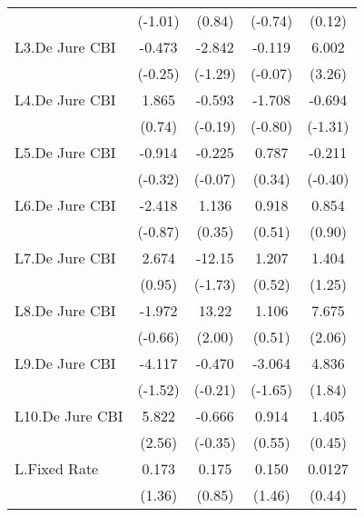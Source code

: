 {\begin{longtable}{l*{4}{c}}
                &  (-1.01)         &   (0.84)         &  (-0.74)         &   (0.12)         \\
[1em]
L3.De Jure CBI  &   -0.473         &   -2.842         &   -0.119         &    6.002\sym{**} \\
                &  (-0.25)         &  (-1.29)         &  (-0.07)         &   (3.26)         \\
[1em]
L4.De Jure CBI  &    1.865         &   -0.593         &   -1.708         &   -0.694         \\
                &   (0.74)         &  (-0.19)         &  (-0.80)         &  (-1.31)         \\
[1em]
L5.De Jure CBI  &   -0.914         &   -0.225         &    0.787         &   -0.211         \\
                &  (-0.32)         &  (-0.07)         &   (0.34)         &  (-0.40)         \\
[1em]
L6.De Jure CBI  &   -2.418         &    1.136         &    0.918         &    0.854         \\
                &  (-0.87)         &   (0.35)         &   (0.51)         &   (0.90)         \\
[1em]
L7.De Jure CBI  &    2.674         &   -12.15         &    1.207         &    1.404         \\
                &   (0.95)         &  (-1.73)         &   (0.52)         &   (1.25)         \\
[1em]
L8.De Jure CBI  &   -1.972         &    13.22\sym{*}  &    1.106         &    7.675\sym{*}  \\
                &  (-0.66)         &   (2.00)         &   (0.51)         &   (2.06)         \\
[1em]
L9.De Jure CBI  &   -4.117         &   -0.470         &   -3.064         &    4.836         \\
                &  (-1.52)         &  (-0.21)         &  (-1.65)         &   (1.84)         \\
[1em]
L10.De Jure CBI &    5.822\sym{*}  &   -0.666         &    0.914         &    1.405         \\
                &   (2.56)         &  (-0.35)         &   (0.55)         &   (0.45)         \\
[1em]
L.Fixed Rate    &    0.173         &    0.175         &    0.150         &   0.0127         \\
                &   (1.36)         &   (0.85)         &   (1.46)         &   (0.44)         \\

\end{longtable}}

